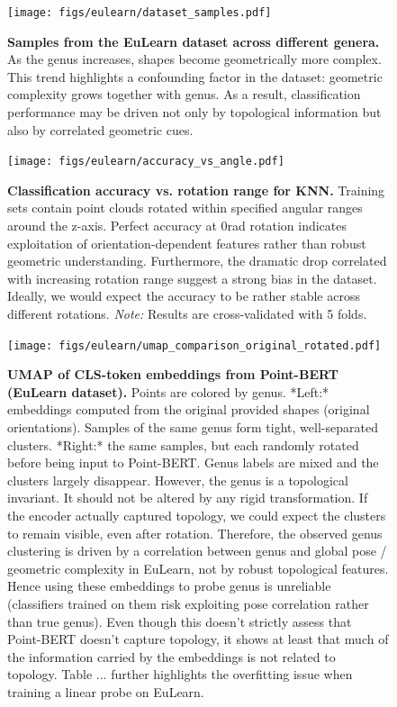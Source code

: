 \begin{figure}[t]
  \centering
  \texttt{[image: figs/eulearn/dataset\_samples.pdf]}
   \caption{\textbf{Samples from the EuLearn dataset across different genera.} As the genus increases, shapes become geometrically more complex. This trend highlights a confounding factor in the dataset: geometric complexity grows together with genus. As a result, classification performance may be driven not only by topological information but also by correlated geometric cues.}
   \label{fig:eulearn-samples}
\end{figure}


\begin{figure}[t]
  \centering
  \texttt{[image: figs/eulearn/accuracy\_vs\_angle.pdf]}
   \caption{\textbf{Classification accuracy vs. rotation range for KNN.} Training sets contain point clouds rotated within specified angular ranges around the z-axis. Perfect accuracy at 0rad rotation indicates exploitation of orientation-dependent features rather than robust geometric understanding. Furthermore, the dramatic drop correlated with increasing rotation range suggest a strong bias in the dataset. Ideally, we would expect the accuracy to be rather stable across different rotations. \textit{Note:} Results are cross-validated with 5 folds.}
   \label{fig:eulearn-acc-angle}
\end{figure}


\begin{figure}[t]
  \centering
  \texttt{[image: figs/eulearn/umap\_comparison\_original\_rotated.pdf]}
   \caption{\textbf{UMAP of CLS-token embeddings from Point-BERT (EuLearn dataset).} Points are colored by genus. *Left:* embeddings computed from the original provided shapes (original orientations). Samples of the same genus form tight, well-separated clusters. *Right:* the same samples, but each randomly rotated before being input to Point-BERT. Genus labels are mixed and the clusters largely disappear. However, the genus is a topological invariant. It should not be altered by any rigid transformation. If the encoder actually captured topology, we could expect the clusters to remain visible, even after rotation. Therefore, the observed genus clustering is driven by a correlation between genus and global pose / geometric complexity in EuLearn, not by robust topological features. Hence using these embeddings to probe genus is unreliable (classifiers trained on them risk exploiting pose correlation rather than true genus). Even though this doesn't strictly assess that Point-BERT doesn't capture topology, it shows at least that much of the information carried by the embeddings is not related to topology. Table ... further highlights the overfitting issue when training a linear probe on EuLearn.}
   \label{fig:eulearn-umap-comparison}
\end{figure}


